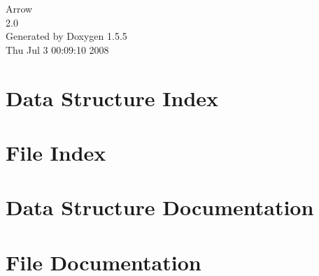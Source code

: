 \documentclass[a4paper]{book}
\begin{document}
\begin{titlepage}
\vspace*{7cm}
\begin{center}
{\Large Arrow \\[1ex]\large 2.0 }\\
\vspace*{1cm}
{\large Generated by Doxygen 1.5.5}\\
\vspace*{0.5cm}
{\small Thu Jul 3 00:09:10 2008}\\
\end{center}
\end{titlepage}
\clearemptydoublepage
{}
\tableofcontents
\clearemptydoublepage
{}
\chapter{Data Structure Index}

\chapter{File Index}

\chapter{Data Structure Documentation}















\chapter{File Documentation}


























\printindex
\end{document}
